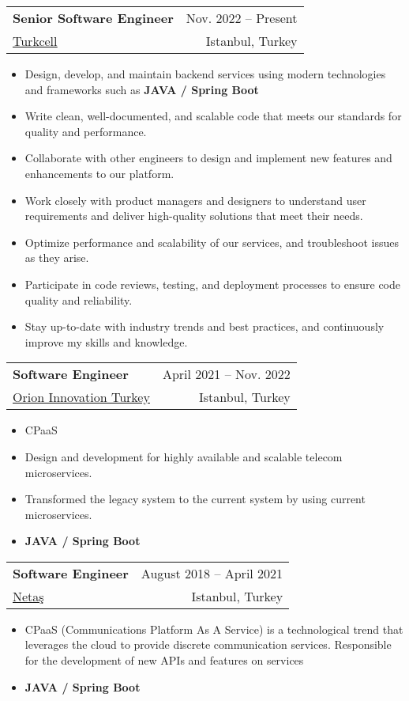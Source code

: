 \documentclass[letterpaper,11pt]{article}
\makeatletter
\newcommand{\resumeItem}[1]{
  \item\small{
    {#1 \vspace{-2pt}}
  }
}
\newcommand{\resumeSubheading}[4]{
  \vspace{-2pt}\item
    \begin{tabular*}{0.97\textwidth}[t]{l@{\extracolsep{\fill}}r}
      \textbf{#1} & #2 \\
      \small#3 & \small #4 \\
    \end{tabular*}\vspace{-7pt}
}
\newcommand{\resumeSubSubheading}[2]{
    \item
    \begin{tabular*}{0.97\textwidth}{l@{\extracolsep{\fill}}r}
      \textit{\small#1} & \textit{\small #2} \\
    \end{tabular*}\vspace{-7pt}
}
\newcommand{\resumeSubHeadingListEnd}{\end{itemize}}
\newcommand{\resumeItemListStart}{\begin{itemize}}
\newcommand{\resumeItemListEnd}{\end{itemize}\vspace{-5pt}}
\makeatother
\begin{document}
    \resumeSubheading
      {Senior Software Engineer}{Nov. 2022 -- Present}
      {\href{https://www.turkcell.com.tr/}{\underline{Turkcell}}}{Istanbul, Turkey}
      \resumeItemListStart
        \resumeItem{Design, develop, and maintain backend services using modern technologies and frameworks such as \textbf{JAVA / Spring Boot } }
        \resumeItem{Write clean, well-documented, and scalable code that meets our standards for quality and performance.}
        \resumeItem{Collaborate with other engineers to design and implement new features and enhancements to our platform.}
        \resumeItem{Work closely with product managers and designers to understand user requirements and deliver high-quality solutions that meet their needs.}
        \resumeItem{Optimize performance and scalability of our services, and troubleshoot issues as they arise.}
        \resumeItem{Participate in code reviews, testing, and deployment processes to ensure code quality and reliability. }
        \resumeItem{Stay up-to-date with industry trends and best practices, and continuously improve my skills and knowledge.}
      \resumeItemListEnd
      

    \resumeSubheading
      {Software Engineer}{April 2021 -- Nov. 2022}
      {\href{https://www.linkedin.com/company/orion-innovation-turkey/}{\underline{Orion Innovation Turkey}}}{Istanbul, Turkey}
      \resumeItemListStart
        \resumeItem{ CPaaS }
        \resumeItem{ Design and development for highly available and scalable telecom microservices.}
        \resumeItem{Transformed the legacy system to the current system by using current microservices.}
        \resumeItem{ \textbf{JAVA / Spring Boot }}
    \resumeItemListEnd

    \resumeSubheading
      {Software Engineer}{August 2018 -- April 2021}
      {\href{https://netas.com.tr/}{\underline{Netaş}}}{Istanbul, Turkey}
      \resumeItemListStart
        \resumeItem{ CPaaS (Communications Platform As A Service) is a technological trend that leverages the cloud to provide discrete communication services. Responsible for the development of new APIs and features on services}
        \resumeItem{\textbf{JAVA / Spring Boot }}
      \resumeItemListEnd
\end{document}
